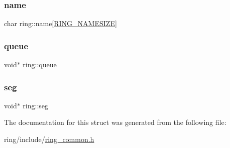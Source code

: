 \subsubsection{\texorpdfstring{name}{name}}
{\footnotesize\ttfamily char ring\+::name\mbox{[}\hyperlink{ring__common_8h_af95a9ad1671f395fd7296f45f170ed3f}{R\+I\+N\+G\+\_\+\+N\+A\+M\+E\+S\+I\+ZE}\mbox{]}}

\mbox{\label{structring_a7689f9d505751e61fdc221130489c26b}} 
\subsubsection{\texorpdfstring{queue}{queue}}
{\footnotesize\ttfamily void$\ast$ ring\+::queue}

\mbox{\label{structring_ac6f2ff647ec154774b1ce234518896e1}} 
\subsubsection{\texorpdfstring{seg}{seg}}
{\footnotesize\ttfamily void$\ast$ ring\+::seg}



The documentation for this struct was generated from the following file\+:\begin{DoxyCompactItemize}
\item 
ring/include/\hyperlink{ring__common_8h}{ring\+\_\+common.\+h}\end{DoxyCompactItemize}
